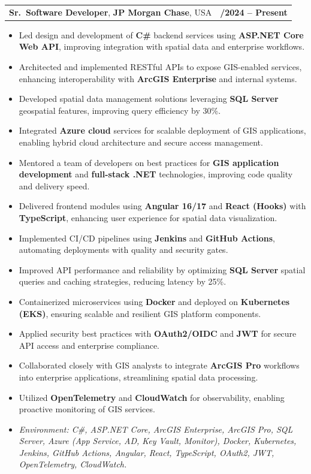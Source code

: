 \documentclass[letterpaper,11pt]{article}
\makeatletter
\newcommand{\resumeItem}[1]{
  \item\footnotesize{
    {#1 \vspace{-2pt}}
  }
}
\newcommand{\resumeSubheading}[4]{
  \vspace{-2pt}\item
    \begin{tabular*}{1.0\textwidth}[t]{l@{\extracolsep{\fill}}r}
      \textbf{\fontsize{10pt}{14pt}\selectfont #3}, \textbf{\fontsize{10pt}{14pt}\selectfont #1}, \fontsize{10pt}{14pt}\selectfont #4 & \textbf{\fontsize{10pt}{14pt}\selectfont #2} \\
    \end{tabular*}\vspace{-7pt}
}
\newcommand{\resumeItemListStart}{\begin{itemize}[leftmargin=*]}
\newcommand{\resumeItemListEnd}{\end{itemize}\vspace{-5pt}}
\makeatother
\begin{document}
\resumeSubheading
{JP Morgan Chase}{09/2024 -- Present}
{Sr.\ Software Developer}{USA}
\resumeItemListStart
  \resumeItem{Led design and development of \textbf{C\#} backend services using \textbf{ASP.NET Core Web API}, improving integration with spatial data and enterprise workflows.}
  \resumeItem{Architected and implemented RESTful APIs to expose GIS-enabled services, enhancing interoperability with \textbf{ArcGIS Enterprise} and internal systems.}
  \resumeItem{Developed spatial data management solutions leveraging \textbf{SQL Server} geospatial features, improving query efficiency by 30\%.}
  \resumeItem{Integrated \textbf{Azure cloud} services for scalable deployment of GIS applications, enabling hybrid cloud architecture and secure access management.}
  \resumeItem{Mentored a team of developers on best practices for \textbf{GIS application development} and \textbf{full-stack .NET} technologies, improving code quality and delivery speed.}
  \resumeItem{Delivered frontend modules using \textbf{Angular 16/17} and \textbf{React (Hooks)} with \textbf{TypeScript}, enhancing user experience for spatial data visualization.}
  \resumeItem{Implemented CI/CD pipelines using \textbf{Jenkins} and \textbf{GitHub Actions}, automating deployments with quality and security gates.}
  \resumeItem{Improved API performance and reliability by optimizing \textbf{SQL Server} spatial queries and caching strategies, reducing latency by 25\%.}
  \resumeItem{Containerized microservices using \textbf{Docker} and deployed on \textbf{Kubernetes (EKS)}, ensuring scalable and resilient GIS platform components.}
  \resumeItem{Applied security best practices with \textbf{OAuth2/OIDC} and \textbf{JWT} for secure API access and enterprise compliance.}
  \resumeItem{Collaborated closely with GIS analysts to integrate \textbf{ArcGIS Pro} workflows into enterprise applications, streamlining spatial data processing.}
  \resumeItem{Utilized \textbf{OpenTelemetry} and \textbf{CloudWatch} for observability, enabling proactive monitoring of GIS services.}
  \resumeItem{\textit{Environment: C\#, ASP.NET Core, ArcGIS Enterprise, ArcGIS Pro, SQL Server, Azure (App Service, AD, Key Vault, Monitor), Docker, Kubernetes, Jenkins, GitHub Actions, Angular, React, TypeScript, OAuth2, JWT, OpenTelemetry, CloudWatch.}}
\resumeItemListEnd
\end{document}
